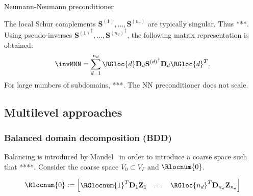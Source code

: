\documentclass{article}
\begin{document}
\begin{algorithm}[ht]
	\caption{Neumann-Neumann preconditioner}
	\label{alg:NN}
	\begin{algorithmic}[1]
		\ENDFOR
	\end{algorithmic}
\end{algorithm}

The local Schur complements $\mathbf{S}^{(1)},\dots,\mathbf{S}^{(n_d)}$ are typically singular.
Thus ***.
Using pseudo-inverses ${\mathbf{S}^{(1)}}^\dagger,\dots,{\mathbf{S}^{(n_d)}}^\dagger$, the following matrix representation is obtained:
\begin{align}
\invMNN=\sum_{d=1}^{n_d}
\RGloc{d}
\mathbf{D}_d
{\mathbf{S}^{(d)}}^\dagger
\mathbf{D}_d
\RGloc{d}^T.
\end{align}
For large numbers of subdomains, ***.
The NN preconditioner does not scale.



\subsection{Multilevel approaches}

\subsubsection{Balanced domain decomposition (BDD)}
Balancing is introduced by Mandel~\cite{Mandel1993} in order to introduce a coarse space such that ****.
Consider the coarse space $V_0\subset V_\Gamma$ and $\Rlocnum{0}$.

\begin{align}
\Rlocnum{0}:=
\begin{bmatrix}
\RGlocnum{1}^T\mathbf{D}_1\mathbf{Z}_1&\dots&\RGloc{n_d}^T\mathbf{D}_{n_d}\mathbf{Z}_{n_d}
\end{bmatrix}
\end{align}
\end{document}
